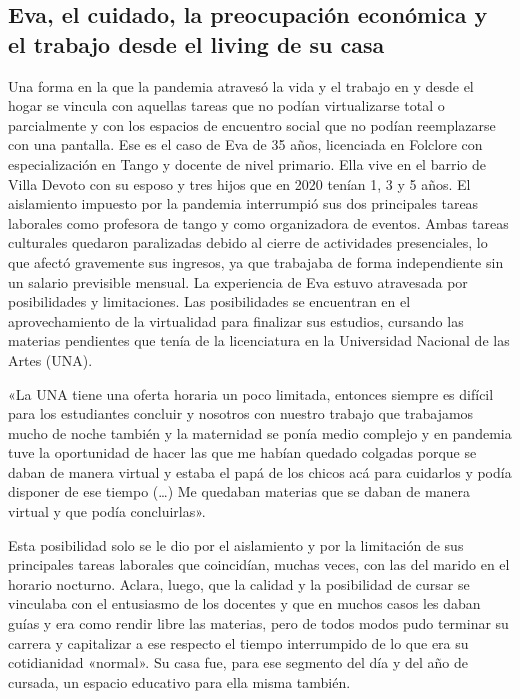 \begin{refsection}
\subsection[Eva, el cuidado, la preocupación económica y el trabajo desde el living de su casa]{Eva, el cuidado, la preocupación económica y el trabajo desde el living de su casa}
\label{cap-28.eva-el-cuidado-la-preocupacion-economica-y-el-trabajo-desde-el-living-de-su-casa}
Una forma en la que la pandemia atravesó la vida y el trabajo en y desde el hogar se vincula con aquellas tareas que no podían virtualizarse total o parcialmente y con los espacios de encuentro social que no podían reemplazarse con una pantalla. Ese es el caso de Eva de 35 años, licenciada en Folclore con especialización en Tango y docente de nivel primario. Ella vive en el barrio de Villa Devoto con su esposo y tres hijos que en 2020 tenían 1, 3 y 5 años. El aislamiento impuesto por la pandemia interrumpió sus dos principales tareas laborales como profesora de tango y como organizadora de eventos. Ambas tareas culturales quedaron paralizadas debido al cierre de actividades presenciales, lo que afectó gravemente sus ingresos, ya que trabajaba de forma independiente sin un salario previsible mensual. La experiencia de Eva estuvo atravesada por posibilidades y limitaciones. Las posibilidades se encuentran en el aprovechamiento de la virtualidad para finalizar sus estudios, cursando las materias pendientes que tenía de la licenciatura en la Universidad Nacional de las Artes (UNA).


\begin{gbcita}
«La UNA tiene una oferta horaria un poco limitada, entonces siempre es difícil para los estudiantes concluir y nosotros con nuestro trabajo que trabajamos mucho de noche también y la maternidad se ponía medio complejo y en pandemia tuve la oportunidad de hacer las que me habían quedado colgadas porque se daban de manera virtual y estaba el papá de los chicos acá para cuidarlos y podía disponer de ese tiempo (…) Me quedaban materias que se daban de manera virtual y que podía concluirlas».

\end{gbcita}

Esta posibilidad solo se le dio por el aislamiento y por la limitación de sus principales tareas laborales que coincidían, muchas veces, con las del marido en el horario nocturno. Aclara, luego, que la calidad y la posibilidad de cursar se vinculaba con el entusiasmo de los docentes y que en muchos casos les daban guías y era como rendir libre las materias, pero de todos modos pudo terminar su carrera y capitalizar a ese respecto el tiempo interrumpido de lo que era su cotidianidad «normal». Su casa fue, para ese segmento del día y del año de cursada, un espacio educativo para ella misma también.


\end{refsection}
